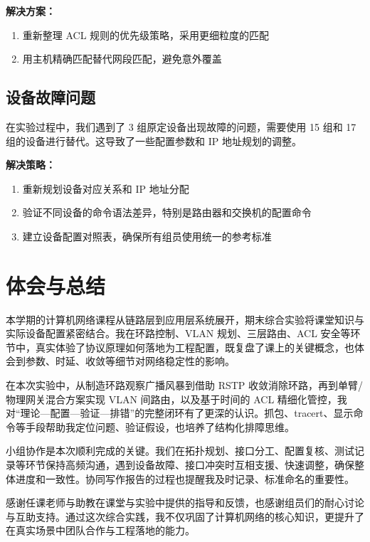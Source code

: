 \documentclass[a4paper]{article}
\begin{document}
\textbf{解决方案：}
\begin{enumerate}
\item 重新整理 ACL 规则的优先级策略，采用更细粒度的匹配
\item 用主机精确匹配替代网段匹配，避免意外覆盖
\end{enumerate}

\subsection{设备故障问题}

在实验过程中，我们遇到了 3 组原定设备出现故障的问题，需要使用 15 组和 17 组的设备进行替代。这导致了一些配置参数和 IP 地址规划的调整。

\textbf{解决策略：}
\begin{enumerate}
\item 重新规划设备对应关系和 IP 地址分配
\item 验证不同设备的命令语法差异，特别是路由器和交换机的配置命令
\item 建立设备配置对照表，确保所有组员使用统一的参考标准
\end{enumerate}

\section{体会与总结}

本学期的计算机网络课程从链路层到应用层系统展开，期末综合实验将课堂知识与实际设备配置紧密结合。我在环路控制、VLAN 规划、三层路由、ACL 安全等环节中，真实体验了协议原理如何落地为工程配置，既复盘了课上的关键概念，也体会到参数、时延、收敛等细节对网络稳定性的影响。

在本次实验中，从制造环路观察广播风暴到借助 RSTP 收敛消除环路，再到单臂/物理网关混合方案实现 VLAN 间路由，以及基于时间的 ACL 精细化管控，我对“理论—配置—验证—排错”的完整闭环有了更深的认识。抓包、tracert、显示命令等手段帮助我定位问题、验证假设，也培养了结构化排障思维。

小组协作是本次顺利完成的关键。我们在拓扑规划、接口分工、配置复核、测试记录等环节保持高频沟通，遇到设备故障、接口冲突时互相支援、快速调整，确保整体进度和一致性。协同写作报告的过程也提醒我及时记录、标准命名的重要性。

感谢任课老师与助教在课堂与实验中提供的指导和反馈，也感谢组员们的耐心讨论与互助支持。通过这次综合实践，我不仅巩固了计算机网络的核心知识，更提升了在真实场景中团队合作与工程落地的能力。
\end{document}
